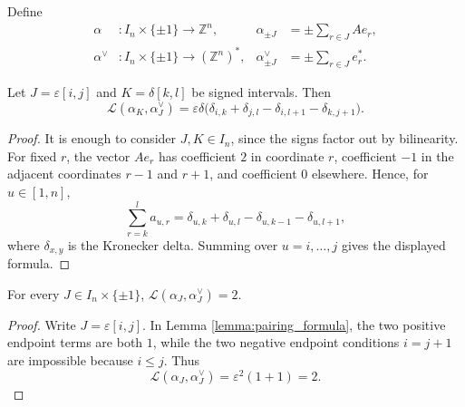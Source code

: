 Define
\begin{align}
    \alpha &: I_n\times\{\pm1\}\to\mathbb{Z}^n,
    &
    \alpha_{\pm J} &= \pm\sum_{r\in J}Ae_r,
    \label{eq:alpha_definition}\\
    \alpha^\vee &: I_n\times\{\pm1\}\to(\mathbb{Z}^n)^*,
    &
    \alpha_{\pm J}^\vee &= \pm\sum_{r\in J}e_r^*.
    \label{eq:alpha_dual_definition}
\end{align}

\begin{lemma}\label{lemma:pairing_formula}
\leanok
Let $J=\varepsilon[i,j]$ and $K=\delta[k,l]$ be signed intervals. Then
\[
    \mathcal{L}(\alpha_K,\alpha_J^\vee)
    =
    \varepsilon\delta
    \bigl(
        \delta_{i,k}
        +\delta_{j,l}
        -\delta_{i,l+1}
        -\delta_{k,j+1}
    \bigr).
\]
\end{lemma}
\begin{proof}
    \leanok
It is enough to consider $J,K \in I_n$, since the signs factor out by
bilinearity. For fixed $r$, the vector $Ae_r$ has coefficient $2$ in
coordinate $r$, coefficient $-1$ in the adjacent coordinates $r-1$ and
$r+1$, and coefficient $0$ elsewhere. Hence, for $u\in[1,n]$,
\[
    \sum_{r=k}^{l} a_{u,r}
    =
    \delta_{u,k}
    +\delta_{u,l}
    -\delta_{u,k-1}
    -\delta_{u,l+1},
\]
where $\delta_{x,y}$ is the Kronecker delta. Summing over $u=i,\ldots,j$ gives the displayed formula.
\end{proof}

\begin{lemma}\label{lemma:alpha_dual_alpha_is_two}
\leanok
For every $J\in I_n\times\{\pm1\}$,
$\mathcal{L}(\alpha_J,\alpha_J^\vee)=2$.
\end{lemma}
\begin{proof}
    \leanok
Write $J=\varepsilon[i,j]$. In Lemma \ref{lemma:pairing_formula}, the two
positive endpoint terms are both $1$, while the two negative endpoint
conditions $i=j+1$ are impossible because $i\le j$. Thus
\[
    \mathcal{L}(\alpha_J,\alpha_J^\vee)
    =
    \varepsilon^2(1+1)=2.
\]
\end{proof}

